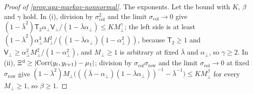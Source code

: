 \begin{proof}[Proof of \cref{prop:apx-markov-nonnormal}]
The exponents. Let the bound with $K$, $\beta$ and $\gamma$ hold. In (i), division by $\sigma_{\mathrm{col}}^2$ and the limit $\sigma_{\mathrm{col}}\to0$ give $(1-\bar\lambda^2)\mathsf T_2\alpha_\perp\mathsf V_\perp/(1-\bar\lambda\alpha_\perp)\le KM_\perp^\gamma$; the left side is at least $(1-\bar\lambda^2)\alpha_\perp^3M_\perp^2/((1-\bar\lambda\alpha_\perp)(1-\alpha_\perp^2))$, because $\mathsf T_2\ge1$ and $\mathsf V_\perp\ge\alpha_\perp^2M_\perp^2/(1-\alpha_\perp^2)$, and $M_\perp\ge1$ is arbitrary at fixed $\bar\lambda$ and $\alpha_\perp$, so $\gamma\ge2$. In (ii), $\Xi^{\mathrm d}\ge\lvert\operatorname{Corr}(y_t,y_{t+1})-\mu_1\rvert$; division by $\sigma_{\mathrm{col}}\sigma_{\mathrm{row}}$ and the limit $\sigma_{\mathrm{col}}\to0$ at fixed $\sigma_{\mathrm{row}}$ give $(1-\bar\lambda^2)M_\perp\bigl(((\bar\lambda-\alpha_\perp)(1-\bar\lambda\alpha_\perp))^{-1}-\bar\lambda^{-1}\bigr)\le KM_\perp^\beta$ for every $M_\perp\ge1$, so $\beta\ge1$.
\end{proof}

